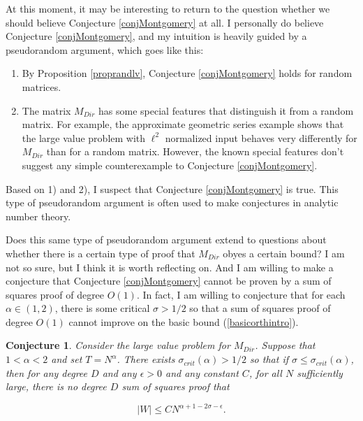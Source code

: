\documentclass{amsart}
\newtheorem{conj}[prop]{Conjecture}
\begin{document}
At this moment,  it may be interesting to return to the question whether we should believe Conjecture \ref{conjMontgomery} at all.   I personally do believe Conjecture \ref{conjMontgomery},  and my intuition is heavily guided by a pseudorandom argument,  which goes like this:

\begin{enumerate}

\item By Proposition \ref{proprandlv},  Conjecture \ref{conjMontgomery} holds for random matrices.   

\item The matrix $M_{Dir}$ has some special features that distinguish it from a random matrix.   For example,  the approximate geometric series example shows that the large value problem with $\ell^2$ normalized input behaves very differently for $M_{Dir}$ than for a random matrix.   However,  the known special features don't suggest any simple counterexample to Conjecture \ref{conjMontgomery}.

\end{enumerate}

\noindent Based on 1) and 2),  I suspect that Conjecture \ref{conjMontgomery} is true.   This type of pseudorandom argument is often used to make conjectures in analytic number theory.

Does this same type of pseudorandom argument extend to questions about whether there is a certain type of proof that $M_{Dir}$ obyes a certain bound?  I am not so sure,  but I think it is worth reflecting on.   And I am willing to make a conjecture that Conjecture \ref{conjMontgomery} cannot be proven by a sum of squares proof of degree $O(1)$.   In fact,  I am willing to conjecture that for each $\alpha \in (1,2)$,  there is some critical $\sigma > 1/2$ so that a sum of squares proof of degree $O(1)$ cannot improve on the basic bound (\ref{basicorthintro}).

\begin{conj} \label{conjmontsos} Consider the large value problem for $M_{Dir}$.   Suppose that $1 < \alpha < 2$ and set $T = N^\alpha$.   There exists $\sigma_{crit} (\alpha) > 1/2$ so that if $\sigma \le \sigma_{crit}(\alpha)$,  then for any degree $D$ and any $\epsilon > 0$ and any constant $C$,  for all $N$ sufficiently large,  there is no degree $D$ sum of squares proof that 

$$|W| \le C N^{\alpha + 1 - 2 \sigma - \epsilon}. $$

\end{conj}
\end{document}
